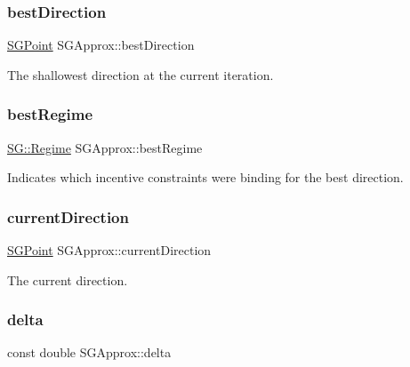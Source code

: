 \subsubsection{\texorpdfstring{best\+Direction}{bestDirection}}
{\footnotesize\ttfamily \hyperlink{classSGPoint}{S\+G\+Point} S\+G\+Approx\+::best\+Direction\hspace{0.3cm}{\ttfamily [private]}}

The shallowest direction at the current iteration. \mbox{\label{classSGApprox_ab2bc5dff1ce46dfe8eb035955b2642fc}} 
\subsubsection{\texorpdfstring{best\+Regime}{bestRegime}}
{\footnotesize\ttfamily \hyperlink{namespaceSG_a139e4dec41ea0f38aae1f93f60cfff60}{S\+G\+::\+Regime} S\+G\+Approx\+::best\+Regime\hspace{0.3cm}{\ttfamily [private]}}

Indicates which incentive constraints were binding for the best direction. \mbox{\label{classSGApprox_ac5bf5f2eba2d65c8a9933b6d74f0cd47}} 
\subsubsection{\texorpdfstring{current\+Direction}{currentDirection}}
{\footnotesize\ttfamily \hyperlink{classSGPoint}{S\+G\+Point} S\+G\+Approx\+::current\+Direction\hspace{0.3cm}{\ttfamily [private]}}

The current direction. \mbox{\label{classSGApprox_ad105b178e4e85845ce5a85e26d7d038b}} 
\subsubsection{\texorpdfstring{delta}{delta}}
{\footnotesize\ttfamily const double S\+G\+Approx\+::delta\hspace{0.3cm}{\ttfamily [private]}}

